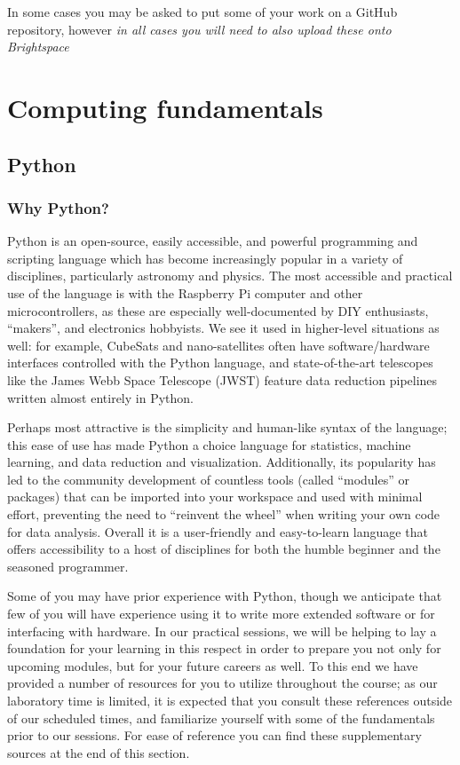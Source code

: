 \documentclass{tufte-book}
\begin{document}
In some cases you may be asked to put some of your work on a GitHub repository, however {\it in all cases you will need to also upload these onto Brightspace} 

\chapter{Computing fundamentals}
\label{ch:python}

\section{Python}
\label{sec:python}
\subsection{Why Python?}
\label{subsec:python-intro}

{Python} is an open-source, easily accessible, and powerful programming and scripting language which has become increasingly popular in a variety of disciplines, particularly astronomy and physics. The most accessible and practical use of the language is with the Raspberry Pi computer and other microcontrollers, as these are especially well-documented by DIY enthusiasts, ``makers'', and electronics hobbyists. We see it used in higher-level situations as well: for example, CubeSats and nano-satellites often have software/hardware interfaces controlled with the Python language, and state-of-the-art telescopes like the James Webb Space Telescope (JWST) feature data reduction pipelines written almost entirely in Python. 

Perhaps most attractive is the simplicity and human-like syntax of the language; this ease of use has made Python a choice language for statistics, machine learning, and data reduction and visualization. Additionally, its popularity has led to the community development of countless tools (called ``modules'' or packages) that can be imported into your workspace and used with minimal effort, preventing the need to ``reinvent the wheel'' when writing your own code for data analysis. Overall it is a user-friendly and easy-to-learn language that offers accessibility to a host of disciplines for both the humble beginner and the seasoned programmer. 

Some of you may have prior experience with Python, though we anticipate that few of you will have experience using it to write more extended software or for interfacing with hardware. In our practical sessions, we will be helping to lay a foundation for your learning in this respect in order to prepare you not only for upcoming modules, but for your future careers as well. To this end we have provided a number of resources for you to utilize throughout the course; as our laboratory time is limited, it is expected that you consult these references outside of our scheduled times, and familiarize yourself with some of the fundamentals prior to our sessions. For ease of reference you can find these supplementary sources at the end of this section.
\end{document}
